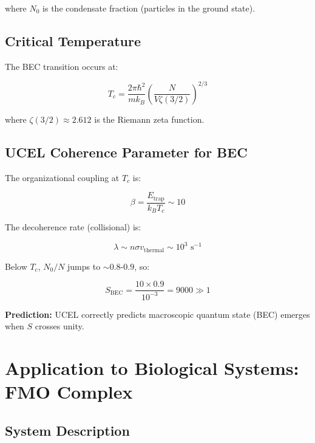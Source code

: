 \documentclass[12pt,a4paper]{article}
\begin{document}
where $N_0$ is the condensate fraction (particles in the ground state).

\subsection{Critical Temperature}

The BEC transition occurs at:

\begin{equation}
T_c = \frac{2\pi\hbar^2}{m k_B}\left(\frac{N}{V\zeta(3/2)}\right)^{2/3}
\tag{S17}
\end{equation}

where $\zeta(3/2) \approx 2.612$ is the Riemann zeta function.

\subsection{UCEL Coherence Parameter for BEC}

The organizational coupling at $T_c$ is:

\begin{equation}
\beta = \frac{E_{\text{trap}}}{k_B T_c} \sim 10
\tag{S18}
\end{equation}

The decoherence rate (collisional) is:

\begin{equation}
\lambda \sim n \sigma v_{\text{thermal}} \sim 10^3 \text{ s}^{-1}
\tag{S19}
\end{equation}

Below $T_c$, $N_0/N$ jumps to $\sim 0.8$-$0.9$, so:

\begin{equation}
S_{\text{BEC}} = \frac{10 \times 0.9}{10^{-3}} = 9000 \gg 1
\tag{S20}
\end{equation}

\textbf{Prediction:} UCEL correctly predicts macroscopic quantum state (BEC) emerges when $S$ crosses unity.

\section{Application to Biological Systems: FMO Complex}

\subsection{System Description}
\end{document}
